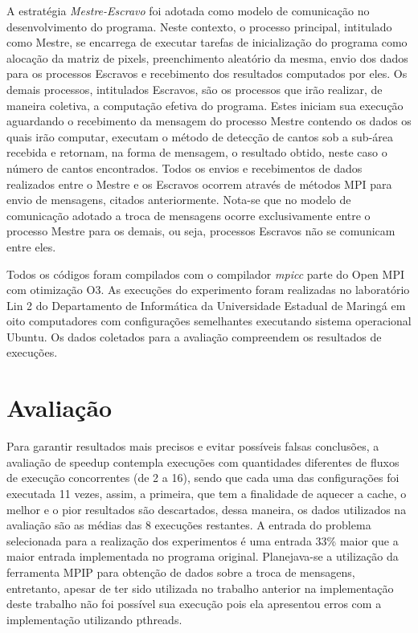 \documentclass[12pt]{article}
\begin{document}
 A estratégia \textit{Mestre-Escravo} foi adotada como modelo de comunicação no desenvolvimento do programa. Neste contexto, o processo principal, intitulado como Mestre, se encarrega de executar tarefas de inicialização do programa como alocação da matriz de pixels, preenchimento aleatório da mesma, envio dos dados para os processos Escravos e recebimento dos resultados computados por eles. Os demais processos, intitulados Escravos, são os processos que irão realizar, de maneira coletiva, a computação efetiva do programa. Estes iniciam sua execução aguardando o recebimento da mensagem do processo Mestre contendo os dados os quais irão computar, executam o método de detecção de cantos sob a sub-área recebida e retornam, na forma de mensagem, o resultado obtido, neste caso o número de cantos encontrados. Todos os envios e recebimentos de dados realizados entre o Mestre e os Escravos ocorrem através de métodos MPI para envio de mensagens, citados anteriormente. Nota-se que no modelo de comunicação adotado a troca de mensagens ocorre exclusivamente entre o processo Mestre para os demais, ou seja, processos Escravos não se comunicam entre eles.

Todos os códigos foram compilados com o compilador \textit{mpicc} parte do Open MPI com otimização O3. As execuções do experimento foram realizadas no laboratório Lin 2 do Departamento de Informática da Universidade Estadual de Maringá em oito computadores com configurações semelhantes executando sistema operacional Ubuntu. Os dados coletados para a avaliação compreendem os resultados de execuções.

\section{Avaliação}

Para garantir resultados mais precisos e evitar possíveis falsas conclusões, a avaliação de speedup contempla execuções com quantidades diferentes de fluxos de execução concorrentes (de 2 a 16), sendo que cada uma das configurações foi executada 11 vezes, assim, a primeira, que tem a finalidade de aquecer a cache, o melhor e o pior resultados são descartados, dessa maneira, os dados utilizados na avaliação são as médias das 8 execuções restantes. A entrada do problema selecionada para a realização dos experimentos é uma entrada 33\% maior que a maior entrada implementada no programa original. Planejava-se a utilização da ferramenta MPIP para obtenção de dados sobre a troca de mensagens, entretanto, apesar de ter sido utilizada no trabalho anterior na implementação deste trabalho não foi possível sua execução pois ela apresentou erros com a implementação utilizando pthreads.
\end{document}
